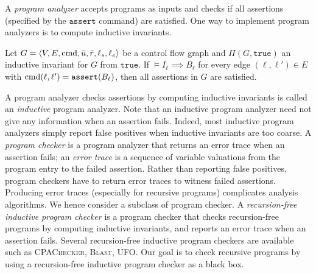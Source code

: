 A \emph{program analyzer} accepts programs as inputs and
checks if all assertions (specified by the $\mathtt{assert}$ command)
are satisfied. One way to implement program analyzers is to compute
inductive invariants. 
\begin{proposition}
Let $G = \langle V, E,\textmd{cmd},\bar{u}, \bar{r},  \ell_s,  \ell_e \rangle$ be a control flow
graph and $\Pi (G, \mathtt{true})$ an inductive invariant for $G$ from
$\mathtt{true}$. If $\models I_{\ell} \implies B_{\ell}$ for every
edge $(\ell, \ell') \in E$ with $\textmd{cmd} (\ell, \ell') =
\mathtt{assert} (B_{\ell})$, then all assertions in $G$ are satisfied.
\label{proposition:inductive-invariant}
\end{proposition}
A program analyzer checks assertions by computing inductive invariants
is called an \emph{inductive} program analyzer. Note that an inductive
program analyzer need not give any information when an assertion fails. 
Indeed, most inductive program analyzers simply report false positives
when inductive invariants are too coarse. A \emph{program checker} is
a program analyzer that returns an error trace when an assertion
fails; an \emph{error trace} is a sequence of variable valuations from
the program entry to the failed assertion. Rather than reporting false
positives, program checkers have to return error traces to witness 
failed assertions. Producing error traces (especially for recursive
programs) complicates analysis algorithms. We hence consider a
subclass of program checker. A \emph{recursion-free
  inductive program checker} is a program checker that checks
recursion-free programs by computing inductive invariants, and reports
an error trace when an assertion fails. Several recursion-free
inductive program checkers are available such as \textsc{CPAChecker},
\textsc{Blast}, \textsc{UFO}. Our goal is to check
recursive programs by using a recursion-free inductive program checker
as a black box. 
